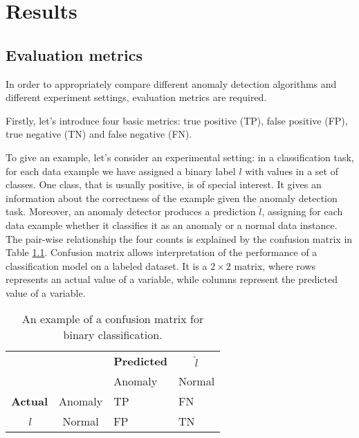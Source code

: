 \chapter{Results}

\section{Evaluation metrics}
In order to appropriately compare different anomaly detection algorithms and different experiment settings, evaluation metrics are required.

Firstly, let's introduce four basic metrics: true positive (TP), false positive (FP), true negative (TN) and false negative (FN). 

To give an example, let's consider an experimental setting: in a classification task, for each data example we have assigned a binary label $l$ with values in a set of classes. One class, that is usually positive, is of special interest. It gives an information about the correctness of the example given the anomaly detection task. Moreover, an anomaly detector produces a prediction $\hat{l}$, assigning for each data example whether it classifies it as an anomaly or a normal data instance. The pair-wise relationship the four counts is explained by the confusion matrix in Table \ref{table:confusionMatrix}. Confusion matrix allows interpretation of the performance of a classification model on a labeled dataset. It is a $2 \times 2$ matrix, where rows represents an actual value of a variable, while columns represent the predicted value of a variable.

\begin{table}[!h]
\centering
\begin{tabular}{cccc}
\multicolumn{1}{r}{}                 &                              & \textbf{Predicted}          &   $\hat{l}$                          \\ \cline{3-4} 
                                     & \multicolumn{1}{l|}{}        & \multicolumn{1}{l|}{Anomaly} & \multicolumn{1}{l|}{Normal} \\ \cline{2-4} 
                                      
\multicolumn{1}{l|}{\textbf{Actual}} & \multicolumn{1}{l|}{Anomaly}  & \multicolumn{1}{l|}{\textcolor{customGreen}{TP}}     & \multicolumn{1}{l|}{\textcolor{customRed}{FN}}      \\ \cline{2-4} 
\multicolumn{1}{c|}{\textit{l}}                & \multicolumn{1}{c|}{Normal} & \multicolumn{1}{l|}{\textcolor{customRed}{FP}}     & \multicolumn{1}{l|}{\textcolor{customGreen}{TN}}      \\ \cline{2-4} 
\end{tabular}
\caption{An example of a confusion matrix for binary classification.}
\label{table:confusionMatrix}
\end{table}

